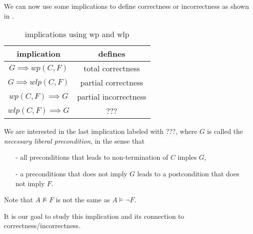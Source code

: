 \documentclass[adraft,hidelinks]{eptcs}
\begin{document}
We can now use some implications to define correctness or incorrectness as shown in . 
\begin{table}\centering 
    \begin{tabular}{cc}
      \textbf{implication}&\textbf{defines}    \\ \hline
      $G\implies wp(C,F)$&   total correctness   \\
      $G\implies wlp(C,F)$&  partial correctness\\
      $wp(C,F)\implies G$&  partial incorrectness\\
      $wlp(C,F)\implies G$&  ???\\
    \end{tabular}
    \caption{implications using wp and wlp\cite{Zhang2022}}
    \label{tab:impl}
\end{table}

We are interested in the last implication labeled with ???, where $G$ is called the \textit{necessary liberal precondition}, in the sense that 
\begin{itemize}
    \item [-] all preconditions that leads to non-termination of $C$ imples $G$, 
    \item [-] a preconditions that does not imply $G$ leads to a postcondition that does not imply $F$. 
\end{itemize}
Note that $A\nvDash F$ is not the same as $A\vDash \neg F$. 

It is our goal to study this implication and its connection to correctness/incorrectness. 

\begin{comment}
\todo[inline, color=pink]{This is where I disagree with the statements in \cite{Zhang2022} top of page 21 : 
``\textit{??? gives rise to a notion of necessary liberal preconditions, in the sense that (1) $G$ contains all initial states $\sigma$ that diverge, and (2) whenever $\sigma\nvDash G$, then $\sigma$ is guaranteed to terminate in a state $\tau \nvDash F$. }''. 
Specifically number (2). Recall definition (using notation in the paper) 
\[\sigma\vDash wlp\bkt{C}(\psi)\text{ iff }\forall\tau\in\bkt{C}(\sigma):\tau\vDash\psi\] 
and $$???\equiv \neg G \implies \neg wlp\bkt{C}(F)$$. 
$$\equiv\neg G \implies\neg(\forall\tau\in\bkt{C}(F):\tau\vDash F)\equiv \neg G \implies\exists\tau\in\bkt{C}(F):\tau\nvDash F$$
From $\neg G$ we can only infer that one of the calculations starting from $\tau$ ends up satisfying $\neg F$. 
And we can assume that the demonic choice would deliver an undsirable result when possible (we desire F or non-termination, but $\neg G$ rules out non-termination), 
then we \textit{should} end up with $\neg F$. 
But it seems to me like loosing non-determinism. For example, 
$$wlp\bkt C (F):= wlp\bkt{x:=x * 2 \square x := x*3} (x\mid 6) $$$$= wlp\bkt{x:=x * 2} (x\mid 6) \wedge wlp\bkt{x := x*3} (x\mid 6) 
$$$$= x\mid 3 \wedge x\mid 2 =: G$$
then with $\sigma(x):=2$ we have $\sigma\nvDash G$. 
But starting from $\sigma$, we can not guarantee final states satisfying $F$, otherwise I think we would lose the nondeterminism. 
If this is true, where does it leave us? What does ??? then tell us? 
}
\end{comment}
\end{document}
